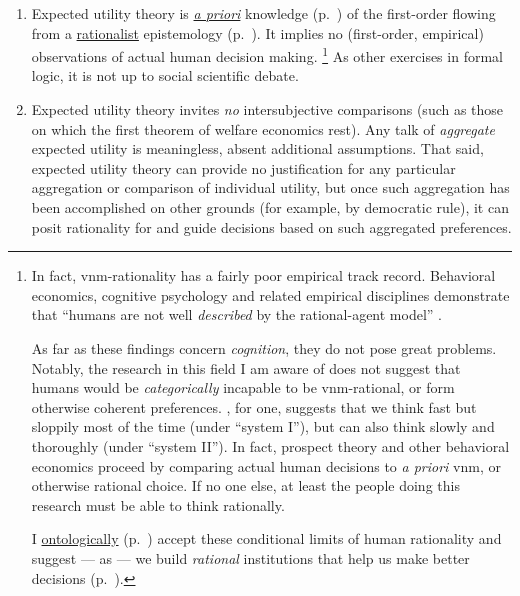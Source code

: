 \begin{enumerate}
	\item
	Expected utility theory is \hyperref[itm:a-priori]{\emph{a priori}} knowledge (p.~\pageref{itm:a-priori}) of the first-order flowing from a \hyperref[itm:rationalism]{rationalist} epistemology (p.~\pageref{itm:rationalism}).
	It implies no (first-order, empirical) observations of actual human decision making.
	\footnote{
		In fact, \gls{vnm}-rationality has a fairly poor empirical track record.
		Behavioral economics, cognitive psychology and related empirical disciplines demonstrate that ``humans are not well \emph{described} by the rational-agent model'' \citep[K7094, emphasis added]{Kahneman2011}.

		As far as these findings concern \emph{cognition}, they do not pose great problems.
		Notably, the research in this field I am aware of does not suggest that humans would be \emph{categorically} incapable to be \gls{vnm}-rational, or form otherwise coherent preferences.
		\citeauthor{Kahneman2011}, for one, suggests that we think fast but sloppily most of the time (under ``system I''), but can also think slowly and thoroughly (under ``system II'').
		In fact, prospect theory and other behavioral economics proceed by comparing actual human decisions to \emph{a priori} \gls{vnm}, or otherwise rational choice.
		If no one else, at least the people doing this research must be able to think rationally.

		I \hyperref[sec:ontology]{ontologically} (p.~\pageref{sec:ontology}) accept these conditional limits of human rationality and suggest --- as \citet[K7094]{Kahneman2011} --- we build \emph{rational} institutions that help us make better decisions (p.~\pageref{sec:contingent-homo-economicus}).
	}
	As other exercises in formal logic, it is not up to social scientific debate.

	\item
	Expected utility theory invites \emph{no} intersubjective comparisons (such as those on which the first theorem of welfare economics rest).
	Any talk of \emph{aggregate} expected utility is meaningless, absent additional assumptions.
	That said, expected utility theory can provide no justification for any particular aggregation or comparison of individual utility, but once such aggregation has been accomplished on other grounds (for example, by democratic rule), it can posit rationality for and guide decisions based on such aggregated preferences.
\end{enumerate}

